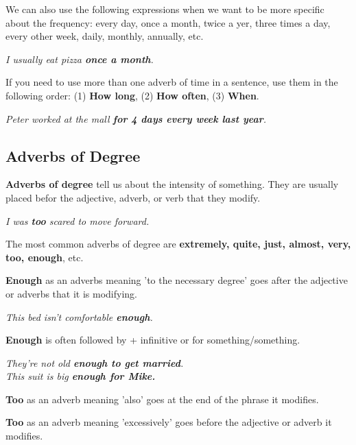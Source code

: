 \documentclass[hidelinks,10pt,a4paper]{article}
\begin{document}
We can also use the following expressions when we want to be more specific about the frequency: every day, once a month, twice a yer, three times a day, every other week, daily, monthly, annually, etc.

\begin{center}
	\textit{I usually eat pizza \textbf{once a month}. }
\end{center}

If you need to use more than one adverb of time in a sentence, use them in the following order: (1) \textbf{How long}, (2) \textbf{How often}, (3) \textbf{When}.

\begin{center}
	\textit{Peter worked at the mall \textbf{for 4 days every week last year}. }
\end{center}

\subsection{Adverbs of Degree}
\textbf{Adverbs of degree} tell us about the intensity of something. They are usually placed befor the adjective, adverb, or verb that they modify.

\begin{center}
	\textit{I was \textbf{too} scared to move forward.}
\end{center}

The most common adverbs of degree are \textbf{extremely, quite, just, almost, very, too, enough}, etc.

\textbf{Enough} as an adverbs meaning 'to the necessary degree' goes after the adjective or adverbs that it is modifying.

\begin{center}
	\textit{This bed isn't comfortable \textbf{enough}.}
\end{center}

\textbf{Enough} is often followed by + infinitive or for something/something.

\begin{center}
	\textit{They're not old \textbf{enough to get married}. \\
	This suit is big \textbf{enough for Mike.} }
\end{center}

\textbf{Too} as an adverb meaning 'also' goes at the end of the phrase it modifies.

\textbf{Too} as an adverb meaning 'excessively' goes before the adjective or adverb it modifies.
\end{document}
